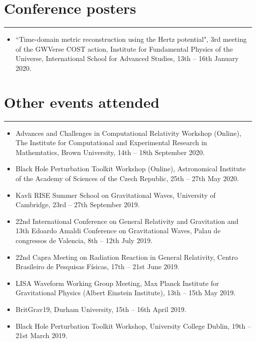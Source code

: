 \documentclass[10.5pt, oneside]{article}   	%
\begin{document}
{\color{Sectioncolour}
\section*{Conference posters}
\vspace{-3mm}
\noindent\rule{\linewidth}{0.6pt}}
\begin{itemize}
\item ``Time-domain metric reconstruction using the Hertz potential", 3rd meeting of the GWVerse COST action, Institute for Fundamental Physics of the Universe, International School for Advanced Studies, 13th -- 16th January 2020.
\end{itemize} 

 
{\color{Sectioncolour}
\section*{Other events attended}
\vspace{-3mm}
\noindent\rule{\linewidth}{0.6pt}}
\begin{itemize}
\item Advances and Challenges in Computational Relativity Workshop (Online), The Institute for Computational and Experimental Research in Mathemtatics, Brown University, 14th -- 18th September 2020.
\item Black Hole Perturbation Toolkit Workshop (Online), Astronomical Institute of the Academy of Sciences of the Czech Republic, 25th -- 27th May 2020.
\item Kavli RISE Summer School on Gravitational Waves, University of Cambridge, 23rd -- 27th September 2019.
\item 22nd International Conference on General Relativity and Gravitation and 13th Edoardo Amaldi Conference on Gravitational Waves, Palau de congressos de Valencia, 8th -- 12th July 2019.
\item 22nd Capra Meeting on Radiation Reaction in General Relativity, Centro Brasileiro de Pesquisas Físicas, 17th -- 21st June 2019.
\item LISA Waveform Working Group Meeting, Max Planck Institute for Gravitational Physics (Albert Einstein Institute), 13th -- 15th May 2019.
\item BritGrav19, Durham University, 15th -- 16th April 2019.
\item Black Hole Perturbation Toolkit Workshop, University College Dublin, 19th -- 21st March 2019.
\end{itemize} 
\end{document}
